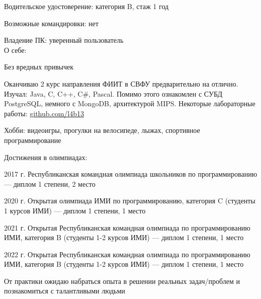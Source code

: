\documentclass[a4paper,12pt]{article}
\begin{document}
Водительское удостоверение: категория B, стаж 1 год

Возможные командировки: нет

Владение ПК: уверенный пользователь\\

О себе:

Без вредных привычек

Оканчиваю 2 курс направления ФИИТ в СВФУ предварительно на отлично. Изучал: Java, C, C++, C\#, Pascal. Помимо этого ознакомлен с СУБД PostgreSQL, немного с MongoDB, архитектурой MIPS. Некоторые лабораторные работы: \href{https://github.com/l4b13/}{github.com/l4b13}

Хобби: видеоигры, прогулки на велосипеде, лыжах, спортивное программирование

Достижения в олимпиадах:

2017 г. Республиканская командная олимпиада школьников по программированию --- диплом 1 степени, 2 место

2020 г. Открытая олимпиада ИМИ по программированию, категория C (студенты 1 курсов ИМИ) --- диплом 1 степени, 1 место

2021 г. Открытая Республиканская командная олимпиада по программированию ИМИ, категория B (студенты 1-2 курсов ИМИ) --- диплом 1 степени, 1 место

2022 г. Открытая Республиканская командная олимпиада по программированию ИМИ, категория B (студенты 1-2 курсов ИМИ) --- диплом 1 степени, 1 место

От практики ожидаю набраться опыта в решении реальных задач/проблем и познакомиться с талантливыми людьми
\end{document}
